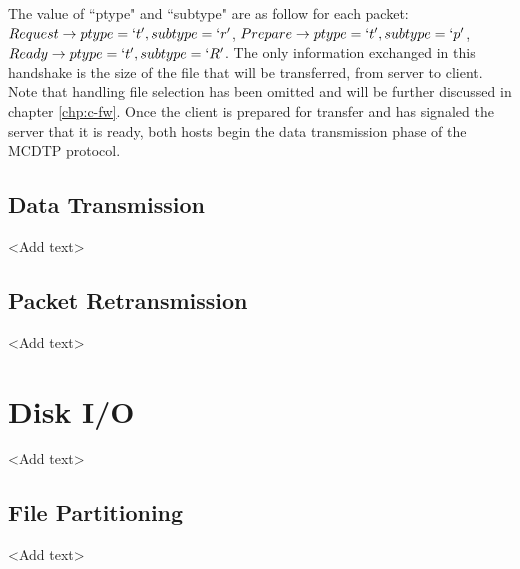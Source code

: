  The value of ``ptype" and ``subtype" are as follow for each packet: $Request \rightarrow ptype = \lq{t}\rq,subtype = \lq{r}\rq$, $Prepare \rightarrow ptype = \lq{t}\rq,subtype = \lq{p}\rq$, $Ready \rightarrow ptype = \lq{t}\rq,subtype = \lq{R}\rq$. The only information exchanged in this handshake is the size of the file that will be transferred, from server to client. Note that handling file selection has been omitted and will be further discussed in chapter \ref{chp:c-fw}. Once the client is prepared for transfer and has signaled the server that it is ready, both hosts begin the data transmission phase of the MCDTP protocol.

\subsection{Data Transmission}

<Add text>

\subsection{Packet Retransmission}

<Add text>

\section{Disk I/O}\label{sec:disk-io}

<Add text>

\subsection{File Partitioning}

<Add text>